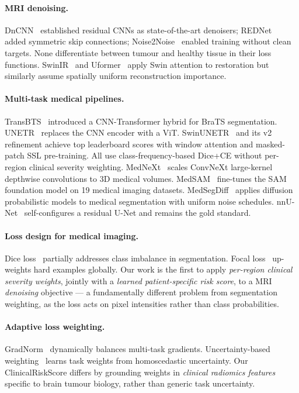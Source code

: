 \documentclass[runningheads]{llncs}
\begin{document}
\paragraph{MRI denoising.}
DnCNN~\cite{dncnn} established residual CNNs as state-of-the-art
denoisers; REDNet~\cite{rednet} added symmetric skip connections;
Noise2Noise~\cite{n2n} enabled training without clean targets.
None differentiate between tumour and healthy tissue in their loss
functions. SwinIR~\cite{swinir} and Uformer~\cite{uformer} apply
Swin attention to restoration but similarly assume spatially uniform
reconstruction importance.

\paragraph{Multi-task medical pipelines.}
TransBTS~\cite{transbts} introduced a CNN-Transformer hybrid for
BraTS segmentation. UNETR~\cite{unetr} replaces the CNN encoder
with a ViT. SwinUNETR~\cite{swinunetr} and its v2 refinement
\cite{swinunetrv2} achieve top leaderboard scores with window attention
and masked-patch SSL pre-training. All use class-frequency-based
Dice+CE without per-region clinical severity weighting.
MedNeXt~\cite{mednext} scales ConvNeXt large-kernel depthwise
convolutions to 3D medical volumes.
MedSAM~\cite{medsam} fine-tunes the SAM foundation model on 19
medical imaging datasets. MedSegDiff~\cite{medsegdiff} applies
diffusion probabilistic models to medical segmentation with uniform
noise schedules.
nnU-Net~\cite{nnunet} self-configures a residual U-Net and remains
the gold standard.

\paragraph{Loss design for medical imaging.}
Dice loss~\cite{milletari2016vnet} partially addresses class imbalance
in segmentation. Focal loss~\cite{lin2017focal} up-weights hard
examples globally. Our work is the first to apply
\emph{per-region clinical severity weights}, jointly with a
\emph{learned patient-specific risk score}, to a MRI
\emph{denoising} objective — a fundamentally different problem
from segmentation weighting, as the loss acts on pixel intensities
rather than class probabilities.

\paragraph{Adaptive loss weighting.}
GradNorm~\cite{chen2018gradnorm} dynamically balances multi-task
gradients. Uncertainty-based weighting~\cite{kendall2018multi} learns
task weights from homoscedastic uncertainty. Our ClinicalRiskScore
differs by grounding weights in \emph{clinical radiomics features}
specific to brain tumour biology, rather than generic task uncertainty.
\end{document}
